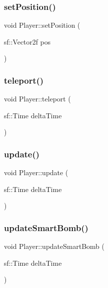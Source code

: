 \mbox{\label{class_player_a04a1bb340ea6d425fb2927c397e96e4e}} 
\subsubsection{\texorpdfstring{set\+Position()}{setPosition()}}
{\footnotesize\ttfamily void Player\+::set\+Position (\begin{DoxyParamCaption}\item[{sf\+::\+Vector2f}]{pos }\end{DoxyParamCaption})}

\mbox{\label{class_player_ad975c53e4e2e21b597079e59c1ed0262}} 
\subsubsection{\texorpdfstring{teleport()}{teleport()}}
{\footnotesize\ttfamily void Player\+::teleport (\begin{DoxyParamCaption}\item[{sf\+::\+Time}]{delta\+Time }\end{DoxyParamCaption})}

\mbox{\label{class_player_aeb1ca63f5401afa5d6aef2f308481672}} 
\subsubsection{\texorpdfstring{update()}{update()}}
{\footnotesize\ttfamily void Player\+::update (\begin{DoxyParamCaption}\item[{sf\+::\+Time}]{delta\+Time }\end{DoxyParamCaption})}

\mbox{\label{class_player_a41a1a1a4f50f7a878ee22c92b42fd2b1}} 
\subsubsection{\texorpdfstring{update\+Smart\+Bomb()}{updateSmartBomb()}}
{\footnotesize\ttfamily void Player\+::update\+Smart\+Bomb (\begin{DoxyParamCaption}\item[{sf\+::\+Time}]{delta\+Time }\end{DoxyParamCaption})}



